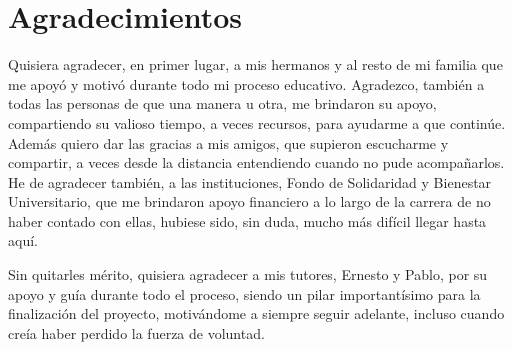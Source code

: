\chapter*{Agradecimientos}

Quisiera agradecer, en primer lugar, a mis hermanos y al resto de mi familia que me apoyó y motivó durante todo mi proceso educativo. 
Agradezco, también a todas las personas de que una manera u otra, me brindaron su apoyo, compartiendo su valioso tiempo, a veces recursos, para ayudarme a que continúe. 
Además quiero dar las gracias a mis amigos, que supieron escucharme y compartir, a veces desde la distancia entendiendo cuando no pude acompañarlos.
He de agradecer también, a las instituciones, Fondo de Solidaridad y Bienestar Universitario, que me brindaron apoyo financiero a lo largo de la carrera
de no haber contado con ellas, hubiese sido, sin duda, mucho más difícil llegar hasta aquí.

Sin quitarles mérito, quisiera agradecer a mis tutores,
Ernesto y Pablo, por su apoyo y guía durante todo el proceso, siendo un pilar importantísimo para la finalización del proyecto, motivándome a siempre seguir adelante, incluso cuando creía haber perdido la fuerza de voluntad.


